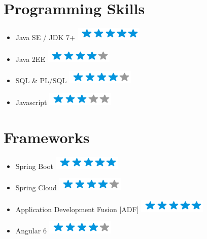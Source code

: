 \documentclass[]{friggeri-cv}
\begin{document}
\section{Programming Skills}
\begin{itemize}
    \item {Java SE / JDK 7+} {\hfill \includegraphics[scale=0.40]{img/5stars.png}} 
	\item {Java 2EE} {\hfill \includegraphics[scale=0.40]{img/4stars.png}}             
    \item {SQL \& PL/SQL} {\hfill \includegraphics[scale=0.40]{img/4stars.png}}  
    \item {Javascript} {\hfill \includegraphics[scale=0.40]{img/3stars.png}} 
       
\end{itemize}

\section{Frameworks}
\begin{itemize} 
    \item {Spring Boot} \hfill \includegraphics[scale=0.40]{img/5stars.png} 
    
    \item {Spring Cloud} \hfill \includegraphics[scale=0.40]{img/4stars.png} 

	\item {Application Development Fusion [ADF]}  \hfill \includegraphics[scale=0.40]{img/5stars.png}   
            
    \item {Angular 6} \hfill \includegraphics[scale=0.40]{img/4stars.png}     
\end{itemize}
  
\end{document}
